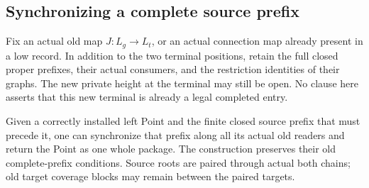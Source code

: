 \subsection{Synchronizing a complete source prefix}
\label{sec:prefix-installation}
Fix an actual old map $J:L_g\to L_t$, or an actual connection map
already present in a low record. In addition to the two terminal
positions, retain the full closed proper prefixes, their actual
consumers, and the restriction identities of their graphs. The new
private height at the terminal may still be open. No clause here
asserts that this new terminal is already a legal completed entry.

\begin{lemma}\label{lem:first-gap}
Given a correctly installed left Point and the finite closed source
prefix that must precede it, one can synchronize that prefix along all
its actual old readers and return the Point as one whole package. The
construction preserves their old complete-prefix conditions. Source
roots are paired through actual both chains; old target coverage blocks
may remain between the paired targets.
\end{lemma}
